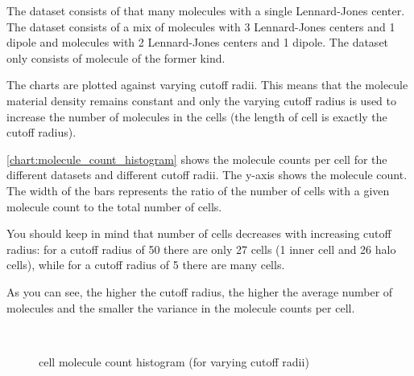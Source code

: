 The  dataset consists of that many molecules with a single Lennard-Jones center.
The  dataset consists of a mix of molecules with 3 Lennard-Jones centers and 1 dipole and molecules with 2 Lennard-Jones centers and 1 dipole.
The  dataset only consists of molecule of the former kind.

The charts are plotted against varying cutoff radii. This means that the molecule material density remains constant and only the varying cutoff radius is used to increase the number of molecules in the cells (the length of cell is exactly the cutoff radius).

\autoref{chart:molecule_count_histogram} shows the molecule counts per cell for the different datasets and different cutoff radii.
The y-axis shows the molecule count. The width of the bars represents the ratio of the number of cells with a given molecule count to the total number of cells.

You should keep in mind that number of cells decreases with increasing cutoff radius: for a cutoff radius of 50 there are only 27 cells (1 inner cell and 26 halo cells), while for a cutoff radius of 5 there are many cells.

As you can see, the higher the cutoff radius, the higher the average number of molecules and the smaller the variance in the molecule counts per cell.

\begin{figure}
\centering
{}
\\
\caption{cell molecule count histogram (for varying cutoff radii)}
\label{chart:molecule_count_histogram}
\end{figure}

